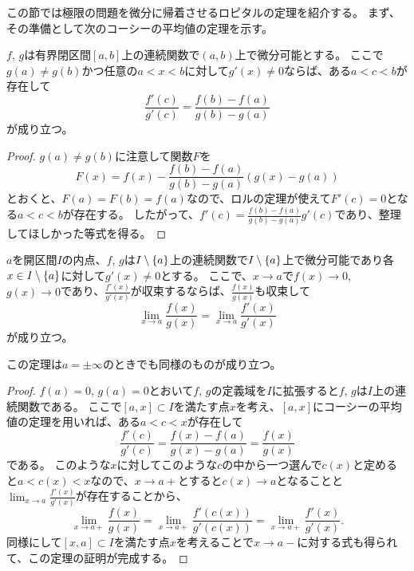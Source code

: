この節では極限の問題を微分に帰着させるロピタルの定理を紹介する。
まず、その準備として次のコーシーの平均値の定理を示す。

\begin{theorem}[コーシーの平均値の定理]
$f$, $g$は有界閉区間$[a, b]$上の連続関数で$(a, b)$上で微分可能とする。
ここで$g(a) \ne g(b)$かつ任意の$a < x < b$に対して$g'(x) \ne 0$ならば、ある$a < c < b$が存在して
$$
\frac{f'(c)}{g'(c)} = \frac{f(b)-f(a)}{g(b)-g(a)}
$$
が成り立つ。
\end{theorem}

\begin{proof}
$g(a) \ne g(b)$に注意して関数$F$を
$$
F(x) = f(x)-\frac{f(b)-f(a)}{g(b)-g(a)}(g(x)-g(a))
$$
とおくと、$F(a) = F(b) = f(a)$なので、ロルの定理が使えて$F'(c) = 0$となる$a < c < b$が存在する。
したがって、$f'(c) = \frac{f(b)-f(a)}{g(b)-g(a)}g'(c)$であり、整理してほしかった等式を得る。
\end{proof}

\begin{theorem}[ロピタルの定理１]
$a$を開区間$I$の内点、$f$, $g$は$I\setminus\{a\}$上の連続関数で$I\setminus\{a\}$上で微分可能であり各$x \in I\setminus\{a\}$に対して$g'(x) \ne 0$とする。
ここで、$x \to a$で$f(x) \to 0$, $g(x) \to 0$であり、$\frac{f'(x)}{g'(x)}$が収束するならば、$\frac{f(x)}{g(x)}$も収束して
$$
\lim_{x \to a}\frac{f(x)}{g(x)} = \lim_{x \to a}\frac{f'(x)}{g'(x)}
$$
が成り立つ。
\end{theorem}

\begin{remark}
この定理は$a = \pm \infty$のときでも同様のものが成り立つ。
\end{remark}

\begin{proof}
$f(a) = 0$, $g(a) = 0$とおいて$f$, $g$の定義域を$I$に拡張すると$f$, $g$は$I$上の連続関数である。
ここで$[a, x] \subset I$を満たす点$x$を考え、$[a, x]$にコーシーの平均値の定理を用いれば、ある$a < c < x$が存在して
$$
\frac{f'(c)}{g'(c)} = \frac{f(x)-f(a)}{g(x)-g(a)} = \frac{f(x)}{g(x)}
$$
である。
このような$x$に対してこのような$c$の中から一つ選んで$c(x)$と定めると$a < c(x) < x$なので、$x \to a+$とすると$c(x) \to a$となることと$\lim_{x \to a}\frac{f'(x)}{g'(x)}$が存在することから、
$$
\lim_{x \to a+}\frac{f(x)}{g(x)} = \lim_{x \to a+}\frac{f'(c(x))}{g'(c(x))} = \lim_{x \to a+}\frac{f'(x)}{g'(x)}.
$$
同様にして$[x, a] \subset I$を満たす点$x$を考えることで$x \to a-$に対する式も得られて、この定理の証明が完成する。
\end{proof}

